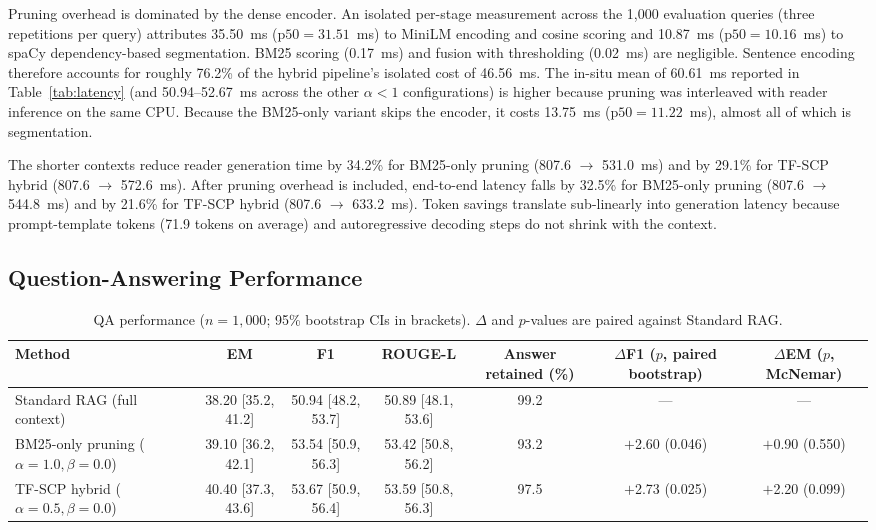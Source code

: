 \documentclass[conference]{IEEEtran}
\begin{document}
Pruning overhead is dominated by the dense encoder. An isolated per-stage measurement across the 1,000 evaluation queries (three repetitions per query) attributes 35.50~ms ($\mathrm{p50} = 31.51$~ms) to MiniLM encoding and cosine scoring and 10.87~ms ($\mathrm{p50} = 10.16$~ms) to spaCy dependency-based segmentation. BM25 scoring (0.17~ms) and fusion with thresholding (0.02~ms) are negligible. Sentence encoding therefore accounts for roughly 76.2\% of the hybrid pipeline's isolated cost of 46.56~ms. The in-situ mean of 60.61~ms reported in Table~\ref{tab:latency} (and 50.94--52.67~ms across the other $\alpha < 1$ configurations) is higher because pruning was interleaved with reader inference on the same CPU. Because the BM25-only variant skips the encoder, it costs 13.75~ms ($\mathrm{p50} = 11.22$~ms), almost all of which is segmentation.

The shorter contexts reduce reader generation time by 34.2\% for BM25-only pruning (807.6 $\rightarrow$ 531.0~ms) and by 29.1\% for TF-SCP hybrid (807.6 $\rightarrow$ 572.6~ms). After pruning overhead is included, end-to-end latency falls by 32.5\% for BM25-only pruning (807.6 $\rightarrow$ 544.8~ms) and by 21.6\% for TF-SCP hybrid (807.6 $\rightarrow$ 633.2~ms). Token savings translate sub-linearly into generation latency because prompt-template tokens (71.9 tokens on average) and autoregressive decoding steps do not shrink with the context.

\subsection{Question-Answering Performance}

\begin{table}[t]
\centering
\caption{QA performance ($n = 1,000$; 95\% bootstrap CIs in brackets). $\Delta$ and $p$-values are paired against Standard RAG.}
\label{tab:qa}
\begin{tabular}{@{}lcccccc@{}}
\toprule
Method & EM & F1 & ROUGE-L & Answer retained (\%) & $\Delta$F1 ($p$, paired bootstrap) & $\Delta$EM ($p$, McNemar) \\
\midrule
Standard RAG (full context) & 38.20 [35.2, 41.2] & 50.94 [48.2, 53.7] & 50.89 [48.1, 53.6] & 99.2 & --- & --- \\
BM25-only pruning ($\alpha = 1.0, \beta = 0.0$) & 39.10 [36.2, 42.1] & 53.54 [50.9, 56.3] & 53.42 [50.8, 56.2] & 93.2 & $+$2.60 (0.046) & $+$0.90 (0.550) \\
TF-SCP hybrid ($\alpha = 0.5, \beta = 0.0$) & 40.40 [37.3, 43.6] & 53.67 [50.9, 56.4] & 53.59 [50.8, 56.3] & 97.5 & $+$2.73 (0.025) & $+$2.20 (0.099) \\
\bottomrule
\end{tabular}
\end{table}
\end{document}
